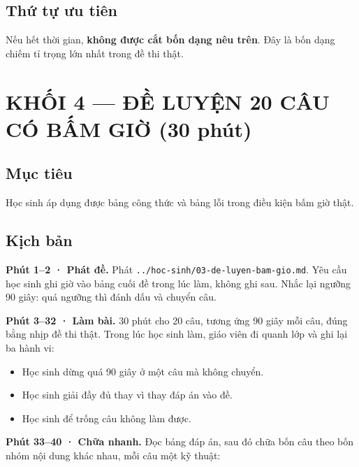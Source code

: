 \documentclass[11pt, a4paper]{article}
\begin{document}
\subsection{Thứ tự ưu tiên}

Nếu hết thời gian, \textbf{không được cắt bốn dạng nêu trên}. Đây là bốn dạng chiếm tỉ trọng lớn nhất trong đề thi thật.

\section{KHỐI 4 — ĐỀ LUYỆN 20 CÂU CÓ BẤM GIỜ (30 phút)}

\subsection{Mục tiêu}

Học sinh áp dụng được bảng công thức và bảng lỗi trong điều kiện bấm giờ thật.

\subsection{Kịch bản}

\textbf{Phút 1–2 · Phát đề.} Phát \texttt{../hoc-sinh/03-de-luyen-bam-gio.md}. Yêu cầu học sinh ghi giờ vào bảng cuối đề trong lúc làm, không ghi sau. Nhắc lại ngưỡng 90 giây: quá ngưỡng thì đánh dấu và chuyển câu.

\textbf{Phút 3–32 · Làm bài.} 30 phút cho 20 câu, tương ứng 90 giây mỗi câu, đúng bằng nhịp đề thi thật. Trong lúc học sinh làm, giáo viên đi quanh lớp và ghi lại ba hành vi:

\begin{itemize}[leftmargin=1.4em, itemsep=2pt]
\item Học sinh dừng quá 90 giây ở một câu mà không chuyển.
\item Học sinh giải đầy đủ thay vì thay đáp án vào đề.
\item Học sinh để trống câu không làm được.
\end{itemize}

\textbf{Phút 33–40 · Chữa nhanh.} Đọc bảng đáp án, sau đó chữa bốn câu theo bốn nhóm nội dung khác nhau, mỗi câu một kỹ thuật:

\end{document}
